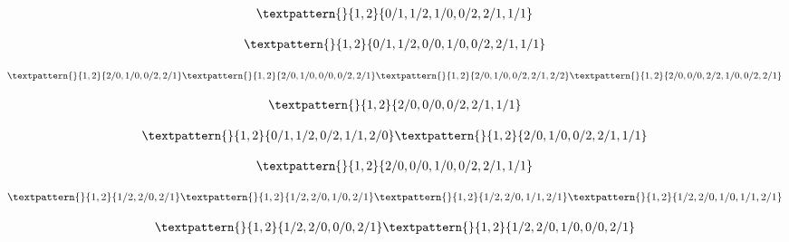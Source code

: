 \begin{equation}
	\begin{gathered}
		\textpattern{}{1,2}{0/1,1/2,1/0,0/2,2/1,1/1}
	\end{gathered}
	\label{cls:63}
\end{equation}

\begin{equation}
	\begin{gathered}
		\textpattern{}{1,2}{0/1,1/2,0/0,1/0,0/2,2/1,1/1}
	\end{gathered}
	\label{cls:64}
\end{equation}

\begin{equation}
	\begin{gathered}
		\textpattern{}{1,2}{2/0,1/0,0/2,2/1}
		\textpattern{}{1,2}{2/0,1/0,0/0,0/2,2/1}
		\textpattern{}{1,2}{2/0,1/0,0/2,2/1,2/2}
		\textpattern{}{1,2}{2/0,0/0,2/2,1/0,0/2,2/1}
	\end{gathered}
	\label{cls:65}
\end{equation}

\begin{equation}
	\begin{gathered}
		\textpattern{}{1,2}{2/0,0/0,0/2,2/1,1/1}
	\end{gathered}
	\label{cls:66}
\end{equation}

\begin{equation}
	\begin{gathered}
		\textpattern{}{1,2}{0/1,1/2,0/2,1/1,2/0}
		\textpattern{}{1,2}{2/0,1/0,0/2,2/1,1/1}
	\end{gathered}
	\label{cls:67}
\end{equation}

\begin{equation}
	\begin{gathered}
		\textpattern{}{1,2}{2/0,0/0,1/0,0/2,2/1,1/1}
	\end{gathered}
	\label{cls:68}
\end{equation}

\begin{equation}
	\begin{gathered}
		\textpattern{}{1,2}{1/2,2/0,2/1}
		\textpattern{}{1,2}{1/2,2/0,1/0,2/1}
		\textpattern{}{1,2}{1/2,2/0,1/1,2/1}
		\textpattern{}{1,2}{1/2,2/0,1/0,1/1,2/1}
	\end{gathered}
	\label{cls:69}
\end{equation}

\begin{equation}
	\begin{gathered}
		\textpattern{}{1,2}{1/2,2/0,0/0,2/1}
		\textpattern{}{1,2}{1/2,2/0,1/0,0/0,2/1}
	\end{gathered}
	\label{cls:70}
\end{equation}

